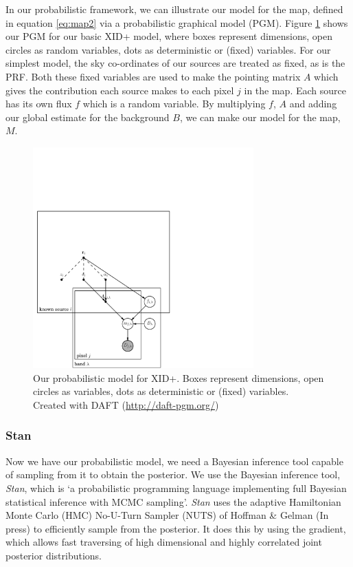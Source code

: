 \documentclass[useAMS,usenatbib]{mn2e}
\begin{document}
In our probabilistic framework, we can illustrate our model for the map, defined in equation \ref{eq:map2} via a probabilistic graphical model (PGM). Figure \ref{fig:graph_mod_xid+} shows our PGM for our basic XID+ model, where boxes represent dimensions, open circles as random variables, dots as deterministic or (fixed) variables. For our simplest model, the sky co-ordinates of our sources are treated as fixed, as is the PRF. Both these fixed variables are used to make the pointing matrix $A$ which gives the contribution each source makes to each pixel $j$ in the map. Each source has its own flux $f$ which is a random variable. By multiplying $f$, $A$ and adding our global estimate for the background $B$, we can make our model for the map, $M$. 
\begin{figure}
\includegraphics[width=8.5cm]{./graphical_model.pdf}
\caption{Our probabilistic model for XID+. Boxes represent dimensions, open circles as variables, dots as deterministic or (fixed) variables. Created with DAFT (\url{http://daft-pgm.org/})}\label{fig:graph_mod_xid+}
\end{figure}
 
\subsubsection{Stan}
Now we have our probabilistic model, we need a Bayesian inference tool capable of sampling from it to obtain the posterior. We use the Bayesian inference tool, \textit{Stan}, which is `a probabilistic programming language implementing full Bayesian statistical inference with MCMC sampling'. \textit{Stan} uses the adaptive Hamiltonian Monte Carlo (HMC) No-U-Turn Sampler (NUTS) of Hoffman & Gelman (In press) to efficiently sample from the posterior. It does this by using the gradient, which allows fast traversing of high dimensional and highly correlated joint posterior distributions. 
\end{document}
